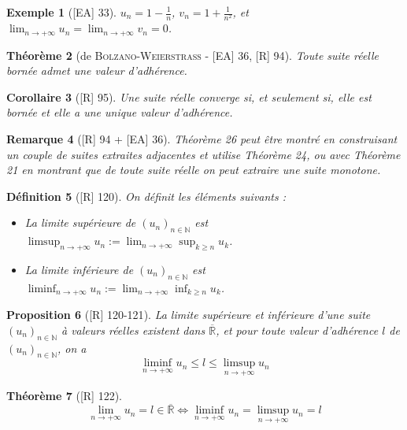 \documentclass[10pt, a4paper, parskip=full, twoside, twocolumn]{report}
\newtheorem{definition}{Définition}
\newtheorem{theorem}[definition]{Théorème}
\newtheorem{proposition}[definition]{Proposition}
\newtheorem{corollary}[definition]{Corollaire}
\newtheorem{example}[definition]{Exemple}
\newtheorem{remark}[definition]{Remarque}
\newcommand{\IN}{\mathbb{N}}
\newcommand{\IR}{\mathbb{R}}
\begin{document}
\begin{example}[\textnormal{[EA] 33}]
	$u_n = 1 - \frac{1}{n}$, $v_n = 1+\frac{1}{n^2}$, et $\displaystyle{\lim_{n\to +\infty} u_n = \lim_{n\to +\infty} v_n = 0}$.
\end{example}

\begin{theorem}[de \textsc{Bolzano-Weierstrass} - \textnormal{[EA] 36, [R] 94}]
	Toute suite réelle bornée admet une valeur d'adhérence.
\end{theorem}

\begin{corollary}[\textnormal{[R] 95}]
	Une suite réelle converge si, et seulement si, elle est bornée et elle a une unique valeur d'adhérence.
\end{corollary}

\begin{remark}[\textnormal{[R] 94 + [EA] 36}]
	Théorème 26 peut être montré en construisant un couple de suites extraites adjacentes et utilise Théorème 24, ou avec Théorème 21 en montrant que de toute suite réelle on peut extraire une suite monotone.
\end{remark}

\begin{definition}[\textnormal{[R] 120}]
	On définit les éléments suivants :
	\begin{itemize}
		\item La \emph{limite supérieure de $\left(u_n\right)_{n\in\IN}$} est $\displaystyle{\limsup_{n\to +\infty} u_n := \lim_{n\to +\infty} \sup_{k\geq n} u_k}$.
		\item La \emph{limite inférieure de $\left(u_n\right)_{n\in\IN}$} est $\displaystyle{\liminf_{n\to +\infty} u_n := \lim_{n\to +\infty} \inf_{k\geq n} u_k}$.
	\end{itemize}
\end{definition}

\begin{proposition}[\textnormal{[R] 120-121}]
	La limite supérieure et inférieure d'une suite $\left(u_n\right)_{n\in\IN}$ à valeurs réelles existent dans $\overline{\IR}$, et pour 
	toute valeur d'adhérence $l$ de $\left(u_n\right)_{n\in\IN}$, on a 
	$$\liminf_{n\to +\infty} u_n \leq l \leq \limsup_{n\to +\infty} u_n$$
\end{proposition}

\begin{theorem}[\textnormal{[R] 122}]
	$$\lim_{n\to +\infty} u_n = l\in\overline{\IR} \iff \liminf_{n\to +\infty} u_n = \limsup_{n\to +\infty} u_n = l$$
\end{theorem}
\end{document}
